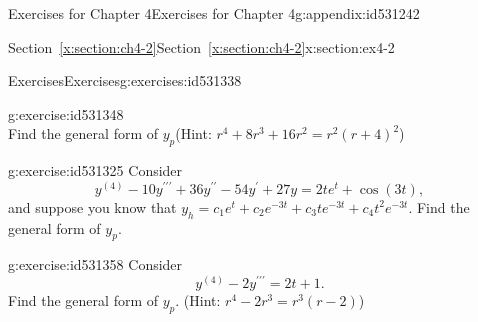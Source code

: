 \documentclass[oneside,10pt,]{book}
\newcommand{\xreffont}{\relax}
\numberwithin{equation}{section}
\numberwithin{equation}{section}
\begin{document}
\begin{appendixptx}{Exercises for Chapter 4}{}{Exercises for Chapter 4}{}{}{g:appendix:id531242}
\begin{sectionptx}{Section~{\xreffont\ref*{x:section:ch4-2}}}{}{Section~{\xreffont\ref*{x:section:ch4-2}}}{}{}{x:section:ex4-2}
\begin{exercises-subsection-numberless}{Exercises}{}{Exercises}{}{}{g:exercises:id531338}
\begin{divisionexercise}{2}{}{}{g:exercise:id531348}
\begin{equation*}
\end{equation*}
Find the general form of \(y_{p}\)(Hint: \(r^{4}+8r^{3}+16r^{2}=r^{2}\left(r+4\right)^{2}\))%
\end{divisionexercise}%
\begin{divisionexercise}{3}{}{}{g:exercise:id531325}%
Consider%
\begin{equation*}
y^{(4)}-10y^{\prime\prime\prime}+36y^{\prime\prime}-54y^{\prime}+27y=2te^{t}+\cos(3t),
\end{equation*}
and suppose you know that \(y_{h}=c_{1}e^{t}+c_{2}e^{-3t}+c_{3}te^{-3t}+c_{4}t^{2}e^{-3t}\). Find the general form of \(y_{p}\).%
\end{divisionexercise}%
\begin{divisionexercise}{4}{}{}{g:exercise:id531358}%
Consider%
\begin{equation*}
y^{(4)}-2y^{\prime\prime\prime}=2t+1.
\end{equation*}
Find the general form of \(y_{p}\). (Hint: \(r^{4}-2r^{3}=r^{3}\left(r-2\right)\))%
\end{divisionexercise}%
\end{exercises-subsection-numberless}
\end{sectionptx}
\end{appendixptx}
%
%
\typeout{************************************************}
\typeout{************************************************}
%
\end{document}
